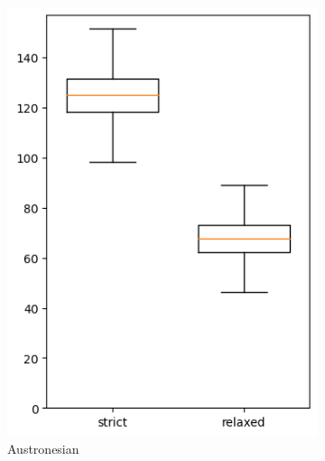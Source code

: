 \documentclass[]{rsos}%
\begin{document}
\begin{figure}
  \centering
  \begin{subfigure}{0.4\textwidth}
    \includegraphics[width=\textwidth]{supplement/analysis/austronesian_years_per_split.png}
    \caption{Austronesian}
  \end{subfigure}
  \begin{subfigure}{0.4\textwidth}

\end{subfigure}
\end{figure}
\end{document}
